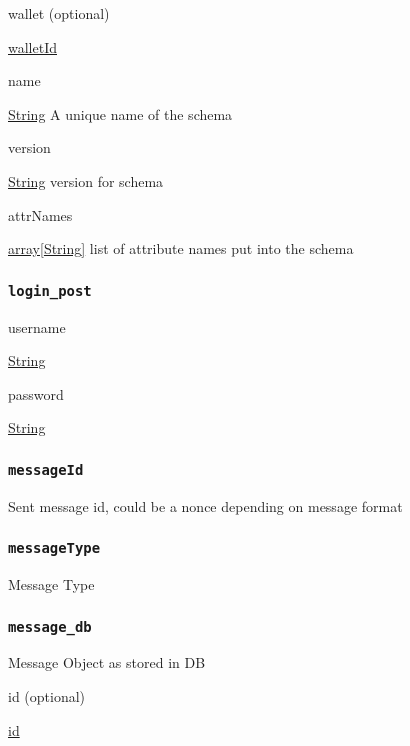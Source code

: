 wallet (optional)

{\protect\hyperlink{walletId}{walletId}}

name

{\protect\hyperlink{string}{String}} A unique name of the schema

version

{\protect\hyperlink{string}{String}} version for schema

attrNames

{\protect\hyperlink{string}{array{[}String{]}}} list of attribute names
put into the schema

\hypertarget{login_post}{%
\subsubsection{\texorpdfstring{\protect\hypertarget{login_post}{}{\texttt{login\_post}}}{login\_post}}\label{login_post}}

username

{\protect\hyperlink{string}{String}}

password

{\protect\hyperlink{string}{String}}

\hypertarget{messageid}{%
\subsubsection{\texorpdfstring{\protect\hypertarget{messageId}{}{\texttt{messageId}}}{messageId}}\label{messageid}}

Sent message id, could be a nonce depending on message format

\hypertarget{messagetype}{%
\subsubsection{\texorpdfstring{\protect\hypertarget{messageType}{}{\texttt{messageType}}}{messageType}}\label{messagetype}}

Message Type

\hypertarget{message_db}{%
\subsubsection{\texorpdfstring{\protect\hypertarget{message_db}{}{\texttt{message\_db}}}{message\_db}}\label{message_db}}

Message Object as stored in DB

id (optional)

{\protect\hyperlink{id}{id}}

